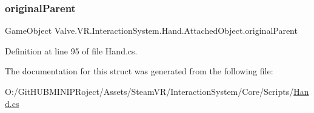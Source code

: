 \subsubsection{\texorpdfstring{originalParent}{originalParent}}
{\footnotesize\ttfamily Game\+Object Valve.\+V\+R.\+Interaction\+System.\+Hand.\+Attached\+Object.\+original\+Parent}



Definition at line 95 of file Hand.\+cs.



The documentation for this struct was generated from the following file\+:\begin{DoxyCompactItemize}
\item 
O\+:/\+Git\+H\+U\+B\+M\+I\+N\+I\+P\+Roject/\+Assets/\+Steam\+V\+R/\+Interaction\+System/\+Core/\+Scripts/\mbox{\hyperlink{_steam_v_r_2_interaction_system_2_core_2_scripts_2_hand_8cs}{Hand.\+cs}}\end{DoxyCompactItemize}
